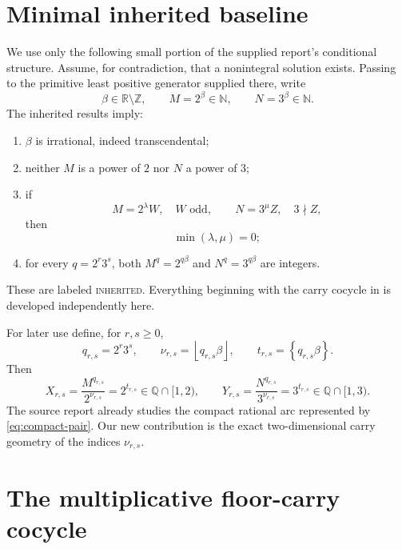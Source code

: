 \documentclass[11pt]{article}
\theoremstyle{definition}
\theoremstyle{remark}
\newcommand{\N}{\mathbb N}
\newcommand{\Z}{\mathbb Z}
\newcommand{\Q}{\mathbb Q}
\newcommand{\R}{\mathbb R}
\newcommand{\fract}[1]{\left\{#1\right\}}
\newcommand{\floor}[1]{\left\lfloor#1\right\rfloor}
\newcommand{\statusinherited}{\textcolor{deepblue}{\textsc{inherited}}}
\begin{document}
\section{Minimal inherited baseline}

We use only the following small portion of the supplied report's conditional
structure.  Assume, for contradiction, that a nonintegral solution exists.  Passing
to the primitive least positive generator supplied there, write
\begin{equation}\label{eq:counterexample-output}
  \beta\in\R\setminus\Z,
  \qquad M=2^\beta\in\N,
  \qquad N=3^\beta\in\N.
\end{equation}
The inherited results imply:
\begin{enumerate}
\item $\beta$ is irrational, indeed transcendental;
\item neither $M$ is a power of $2$ nor $N$ a power of $3$;
\item if
\begin{equation}\label{eq:structural-valuations}
 M=2^\lambda W,\quad W\text{ odd},
 \qquad
 N=3^\mu Z,\quad 3\nmid Z,
\end{equation}
then
\begin{equation}\label{eq:primitive-depth}
 \min(\lambda,\mu)=0;
\end{equation}
\item for every $q=2^r3^s$, both $M^q=2^{q\beta}$ and
$N^q=3^{q\beta}$ are integers.
\end{enumerate}
These are labeled \statusinherited.  Everything beginning with the carry cocycle in
 is developed independently here.

For later use define, for $r,s\ge0$,
\begin{equation}\label{eq:nu-t}
 q_{r,s}=2^r3^s,
 \qquad
 \nu_{r,s}=\floor{q_{r,s}\beta},
 \qquad
 t_{r,s}=\fract{q_{r,s}\beta}.
\end{equation}
Then
\begin{equation}\label{eq:compact-pair}
 X_{r,s}=\frac{M^{q_{r,s}}}{2^{\nu_{r,s}}}=2^{t_{r,s}}\in\Q\cap[1,2),
 \qquad
 Y_{r,s}=\frac{N^{q_{r,s}}}{3^{\nu_{r,s}}}=3^{t_{r,s}}\in\Q\cap[1,3).
\end{equation}
The source report already studies the compact rational arc represented by
\eqref{eq:compact-pair}.  Our new contribution is the exact two-dimensional carry
geometry of the indices $\nu_{r,s}$.

\section{The multiplicative floor-carry cocycle}\label{sec:carry-cocycle}
\end{document}
